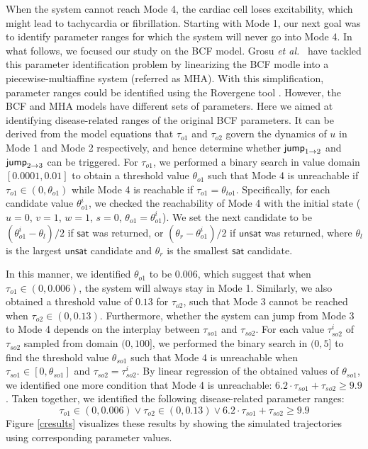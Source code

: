 When the system cannot reach Mode 4, the cardiac cell loses excitability, which might lead to tachycardia or fibrillation. Starting with Mode 1, our next goal was to identify parameter ranges for which the system will never go into Mode 4. In what follows, we focused our study on the BCF model. 
Grosu {\em et al.}~\cite{grosu11} have tackled this parameter identification problem by linearizing the BCF modle into a piecewise-multiaffine system (referred as MHA). With this simplification, parameter ranges could be identified using the Rovergene tool \cite{rovergene}. However, the BCF and MHA models have different sets of parameters. Here we aimed at identifying disease-related ranges of the original BCF parameters. It can be derived from the model equations that $\tau_{o1}$ and $\tau_{o2}$ govern the dynamics of $u$ in Mode 1 and Mode 2 respectively, and hence determine whether $\mathsf{jump}_{1\rightarrow 2}$ and  $\mathsf{jump}_{2\rightarrow 3}$ can be triggered. For $\tau_{o1}$, we performed a binary search in value domain $[0.0001,0.01]$ to obtain a threshold value $\theta_{o1}$ such that Mode 4 is unreachable if $\tau_{o1} \in (0, \theta_{o1})$ while Mode 4 is reachable if $\tau_{o1} =  \theta_{to1}$. Specifically, for each candidate value $\theta^i_{o1}$, we checked the reachability of Mode 4 with the initial state ($u = 0$, $v = 1$, $w = 1$, $s = 0$, $\theta_{o1} = \theta^i_{o1}$). We set the next candidate to be $(\theta^i_{o1} -\theta_{l})/2$ if $\mathsf{sat}$ was returned, or $(\theta_{r} - \theta^i_{o1})/2$ if $\mathsf{unsat}$ was returned, where $\theta_{l}$ is the largest $\mathsf{unsat}$ candidate and $\theta_{r}$ is the smallest $\mathsf{sat}$ candidate. 

In this manner, we identified $\theta_{o1}$ to be $0.006$, which suggest that when $\tau_{o1} \in (0, 0.006)$, the system will always stay in Mode 1. Similarly, we also obtained a threshold value of $0.13$ for $\tau_{o2}$, such that Mode 3 cannot be reached when $\tau_{o2} \in (0, 0.13)$. Furthermore, whether the system can jump from Mode 3 to Mode 4 depends on the interplay between $\tau_{so1}$ and $\tau_{so2}$.  For each value $\tau_{so2}^i$ of $\tau_{so2}$ sampled from domain $(0, 100]$, we performed the binary search in $(0, 5]$ to find the threshold value $\theta_{so1}$ such that Mode 4 is unreachable when $\tau_{so1} \in [0,\theta_{so1}]$ and $\tau_{so2} = {\tau_{so2}^i}$. By linear regression of the obtained values of $\theta_{so1}$, we identified one more condition that Mode 4 is unreachable:  $6.2 \cdot \tau_{so1} + \tau_{so2} \ge 9.9$. Taken together, we identified the following disease-related parameter ranges:  
$$\tau_{o1} \in (0,0.006)\vee \tau_{o2} \in (0,0.13)\vee 6.2 \cdot \tau_{so1} + \tau_{so2} \ge 9.9$$
Figure \ref{cresults} visualizes these results by showing the simulated trajectories using corresponding  parameter values.

